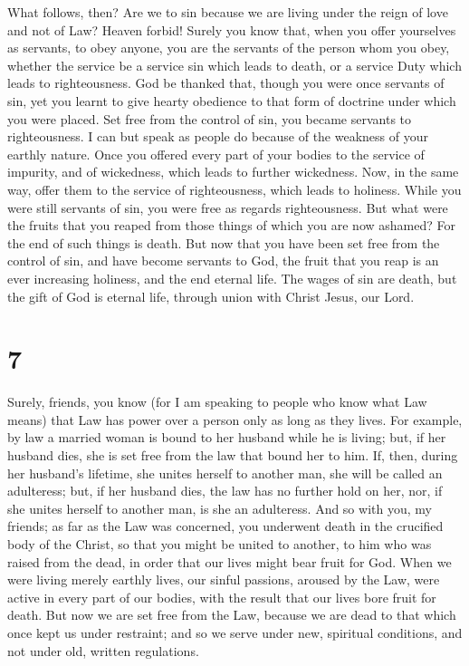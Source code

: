  What follows, then? Are we to sin because we are living
under the reign of love and not of Law? Heaven forbid! 
Surely you know that, when you offer yourselves as servants, to obey
anyone, you are the servants of the person whom you obey, whether the
service be a service sin which leads to death, or a service Duty which
leads to righteousness.  God be thanked that, though you
were once servants of sin, yet you learnt to give hearty obedience to
that form of doctrine under which you were placed.  Set
free from the control of sin, you became servants to righteousness.
 I can but speak as people do because of the weakness of
your earthly nature. Once you offered every part of your bodies to the
service of impurity, and of wickedness, which leads to further
wickedness. Now, in the same way, offer them to the service of
righteousness, which leads to holiness.  While you were
still servants of sin, you were free as regards righteousness.
 But what were the fruits that you reaped from those things
of which you are now ashamed? For the end of such things is death.
 But now that you have been set free from the control of
sin, and have become servants to God, the fruit that you reap is an ever
increasing holiness, and the end eternal life.  The wages
of sin are death, but the gift of God is eternal life, through union
with Christ Jesus, our Lord.

\hypertarget{section-6}{%
\section{7}\label{section-6}}

 Surely, friends, you know (for I am speaking to people who
know what Law means) that Law has power over a person only as long as
they lives.  For example, by law a married woman is bound to
her husband while he is living; but, if her husband dies, she is set
free from the law that bound her to him.  If, then, during
her husband's lifetime, she unites herself to another man, she will be
called an adulteress; but, if her husband dies, the law has no further
hold on her, nor, if she unites herself to another man, is she an
adulteress.  And so with you, my friends; as far as the Law
was concerned, you underwent death in the crucified body of the Christ,
so that you might be united to another, to him who was raised from the
dead, in order that our lives might bear fruit for God. 
When we were living merely earthly lives, our sinful passions, aroused
by the Law, were active in every part of our bodies, with the result
that our lives bore fruit for death.  But now we are set
free from the Law, because we are dead to that which once kept us under
restraint; and so we serve under new, spiritual conditions, and not
under old, written regulations.

